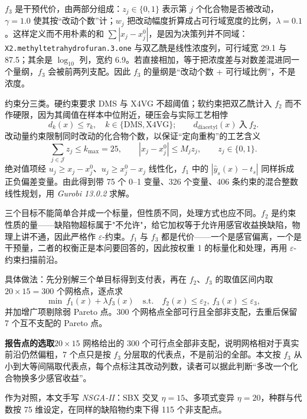 $f_3$ 是干预代价，由两部分组成：$z_j\in\{0,1\}$ 表示第 $j$ 个化合物是否被改动，$\gamma=1.0$ 使其按“改动个数”计；$w_j$ 把改动幅度折算成占可行域宽度的比例，$\lambda=0.1$。这样定义而不用朴素的和 $\sum|x_j-x_j^0|$，是因为决策列并不同域：\texttt{X2.methyl\allowbreak tetrahydrofuran}\allowbreak\texttt{.3.one} 与双乙酰是线性浓度列，可行域宽 29.1 与 87.5；其余是 $\log_{10}$ 列，宽约 6.9。若直接相加，等于把浓度差与对数差混进同一个量纲，$f_3$ 会被前两列支配。因此 $f_3$ 的量纲是“改动个数 + 可行域比例”，不是浓度。

约束分三类。硬约束要求 DMS 与 X4VG 不超阈值；软约束把双乙酰计入 $f_2$ 而不作硬限，因为其阈值在样本中位附近，硬压会与实际工艺相悖
\begin{equation}
  d_k(x)\le\tau_k,\quad k\in\{\text{DMS},\text{X4VG}\};\qquad
  d_{\text{diacetyl}}(x)\ \text{入}\ f_2 .
\end{equation}
改动量约束限制同时改动的化合物个数，以保证“定向重构”的工艺含义
\begin{equation}
  \sum_{j\in\mathcal{J}}z_j\le k_{\max}=25,\qquad
  \left|x_j-x_j^0\right|\le M_j z_j,\qquad z_j\in\{0,1\}.
\end{equation}
绝对值项经 $u_j\ge x_j-x_j^0$、$u_j\ge x_j^0-x_j$ 线性化，$f_1$ 中的 $|\hat y_s(x)-t_s|$ 同样拆成正负偏差变量。由此得到带 75 个 0--1 变量、326 个变量、406 条约束的混合整数线性规划，用 \emph{Gurobi 13.0.2} 求解。

三个目标不能简单合并成一个标量，但性质不同，处理方式也应不同。$f_2$ 是约束性质的量——缺陷物超标属于"不允许"，给它加权等于允许用感官收益换缺陷，物理上讲不通，因此严格作 $\varepsilon$-约束。$f_1$ 与 $f_3$ 都是代价——一个是感官偏离，一个是干预量，二者的权衡正是本问要回答的，因此按权重 1 的标量化和处理，再用 $\varepsilon$-约束扫描前沿。

具体做法：先分别解三个单目标得到支付表，再在 $f_2$、$f_3$ 的取值区间内取 $20\times15=300$ 个网格点，逐点求
\begin{equation}
  \min\ f_1(x)+\lambda f_3(x)\quad \text{s.t.}\quad f_2(x)\le\varepsilon_2,\ f_3(x)\le\varepsilon_3,
\end{equation}
并加增广项剔除弱 Pareto 点。300 个网格点全部可行且全部非支配，去重后保留 7 个互不支配的 Pareto 点。

\textbf{报告点的选取}\quad $20\times15$ 网格给出的 300 个可行点全部非支配，说明网格相对于真实前沿仍然偏粗，7 个点只是按 $f_3$ 分层取的代表点，不是前沿的全部。本文按 $f_3$ 从小到大等间隔取代表点，每个点标注其改动列数，读者可以据此判断“多改一个化合物换多少感官收益”。

作为对照，本文手写 \emph{NSGA-II}：SBX 交叉 $\eta=15$、多项式变异 $\eta=20$，种群与代数按 75 维设定，在同样的缺陷物约束下得 115 个非支配点。

